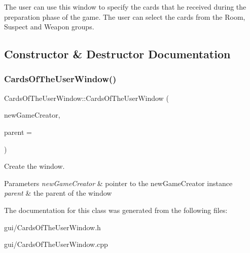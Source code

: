 The user can use this window to specify the cards that he received during the preparation phase of the game. The user can select the cards from the Room, Suspect and Weapon groups. 

\subsection{Constructor \& Destructor Documentation}
\mbox{\label{classCardsOfTheUserWindow_a2196040b2451a78b75855244f7ab52e2}} 
\subsubsection{\texorpdfstring{Cards\+Of\+The\+User\+Window()}{CardsOfTheUserWindow()}}
{\footnotesize\ttfamily Cards\+Of\+The\+User\+Window\+::\+Cards\+Of\+The\+User\+Window (\begin{DoxyParamCaption}\item[{\hyperlink{classNewGameCreator}{New\+Game\+Creator} $\ast$}]{new\+Game\+Creator,  }\item[{Q\+Widget $\ast$}]{parent = {} }\end{DoxyParamCaption})}



Create the window. 


\begin{DoxyParams}{Parameters}
{\em new\+Game\+Creator} & pointer to the new\+Game\+Creator instance \\
\hline
{\em parent} & the parent of the window \\
\hline
\end{DoxyParams}


The documentation for this class was generated from the following files\+:\begin{DoxyCompactItemize}
\item 
gui/Cards\+Of\+The\+User\+Window.\+h\item 
gui/Cards\+Of\+The\+User\+Window.\+cpp\end{DoxyCompactItemize}
